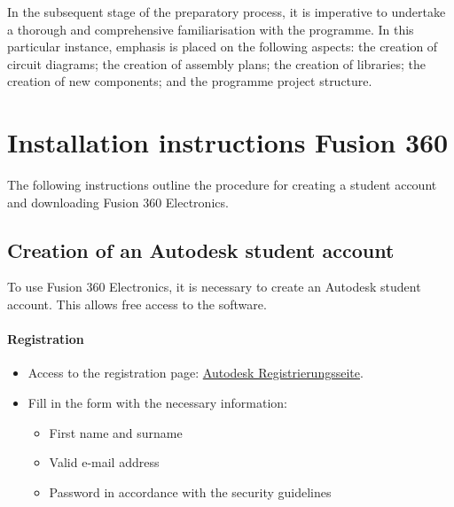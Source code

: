 In the subsequent stage of the preparatory process, it is imperative to undertake a thorough and comprehensive familiarisation with the programme. In this particular instance, emphasis is placed on the following aspects: the creation of circuit diagrams; the creation of assembly plans; the creation of libraries; the creation of new components; and the programme project structure.



\section{Installation instructions Fusion 360}
The following instructions outline the procedure for creating a student account and downloading Fusion 360 Electronics.

\subsection*{Creation of an Autodesk student account}

To use Fusion 360 Electronics, it is necessary to create an Autodesk student account. This allows free access to the software.

\paragraph{ Registration}
\begin{itemize}
	\item Access to the registration page: \href{https://accounts.autodesk.com/register?resume=/as/fMRyxxIM12/resume/as/authorization.ping&ack=uWlmiJuqQqVaAQjGdojc8Qxit4KVdorZ}{\underline{Autodesk Registrierungsseite}}.
	\item Fill in the form with the necessary information:
	\begin{itemize}
		\item First name and surname
		\item Valid e-mail address
		\item Password in accordance with the security guidelines%
	\end{itemize}
\end{itemize}

